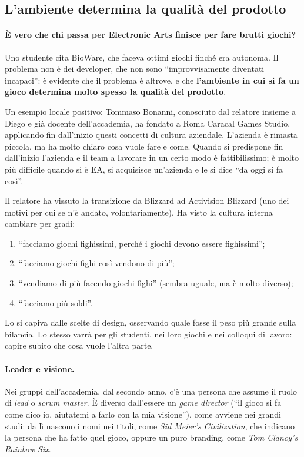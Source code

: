 \subsection{L'ambiente determina la qualità del prodotto}

\paragraph{È vero che chi passa per Electronic Arts finisce per fare brutti
giochi?} Uno studente cita BioWare, che faceva ottimi giochi finché era
autonoma. Il problema non è dei developer, che non sono ``improvvisamente
diventati incapaci'': è evidente che il problema è altrove, e che
\textbf{l'ambiente in cui si fa un gioco determina molto spesso la qualità del
prodotto}.

Un esempio locale positivo: Tommaso Bonanni, conosciuto dal relatore insieme a
Diego e già docente dell'accademia, ha fondato a Roma Caracal Games Studio,
applicando fin dall'inizio questi concetti di cultura aziendale. L'azienda è
rimasta piccola, ma ha molto chiaro cosa vuole fare e come. Quando si
predispone fin dall'inizio l'azienda e il team a lavorare in un certo modo è
fattibilissimo; è molto più difficile quando si è EA, si acquisisce
un'azienda e le si dice ``da oggi si fa così''.

Il relatore ha vissuto la transizione da Blizzard ad Activision Blizzard (uno
dei motivi per cui se n'è andato, volontariamente). Ha visto la cultura
interna cambiare per gradi:
\begin{enumerate}
  \item ``facciamo giochi fighissimi, perché i giochi devono essere
        fighissimi'';
  \item ``facciamo giochi fighi così vendono di più'';
  \item ``vendiamo di più facendo giochi fighi'' (sembra uguale, ma è molto
        diverso);
  \item ``facciamo più soldi''.
\end{enumerate}
Lo si capiva dalle scelte di design, osservando quale fosse il peso più
grande sulla bilancia. Lo stesso varrà per gli studenti, nei loro giochi e nei
colloqui di lavoro: capire subito che cosa vuole l'altra parte.

\paragraph{Leader e visione.} Nei gruppi dell'accademia, dal secondo anno, c'è
una persona che assume il ruolo di \emph{lead} o \emph{scrum master}. È
diverso dall'essere un \emph{game director} (``il gioco si fa come dico io,
aiutatemi a farlo con la mia visione''), come avviene nei grandi studi: da lì
nascono i nomi nei titoli, come \emph{Sid Meier's Civilization}, che indicano
la persona che ha fatto quel gioco, oppure un puro branding, come \emph{Tom
Clancy's Rainbow Six}.

